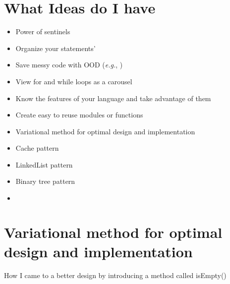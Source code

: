 \section[Ideas]{What Ideas do I have}
\begin{itemize}
    \item Power of sentinels
    \item Organize your  statements'
    \item Save messy code with OOD (\textit{e.g.}, )
    \item View for and while loops as a carousel
    \item Know the features of your language and take advantage of them
    \item Create easy to reuse modules or functions
    \item Variational method for optimal design and implementation
    \item Cache pattern
    \item LinkedList pattern
    \item Binary tree pattern
    \item
\end{itemize}

\section{Variational method for optimal design and implementation}

How I came to a better design by introducing a method called isEmpty()

